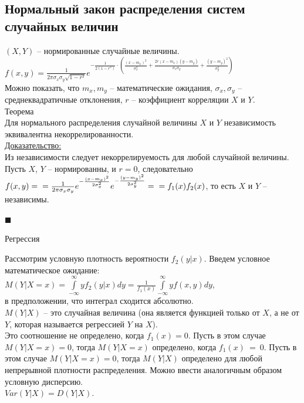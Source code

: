 \documentclass[russian, 12pt, fleqn]{article}
\begin{document}
\subsection{Нормальный закон распределения систем случайных величин}
$(X, Y)$ -- нормированные случайные величины.\\
$f(x, y) = \frac{1}{2\pi\sigma_x\sigma_y\sqrt{1-r^2}} e^{{-\frac{1}{2(1-r^2)}\cdot (\frac{(x-m_x)^2}{\sigma_x^2} + \frac{2r(x-m_x)(y-m_y)}{\sigma_x\sigma_y} + \frac{(y-m_y)^2}{\sigma_y^2})}}$\\
Можно показать, что $m_x, m_y$ -- математические ожидания, $\sigma_x ,\sigma_y$ -- среднеквадратичные  отклонения, $r$  -- коэффициент корреляции $X$ и $Y$.\\
$\textbf{Теорема}$\\
Для нормального распределения случайной величины $X$ и $Y$ независимость эквивалентна некоррелированности.\\
\underline{Доказательство:}\\
Из независимости следует некоррелируемость для любой случайной величины.\\
Пусть $X$, $Y$ -- нормированны, и $r=0$, следовательно $f(x, y) = \\=\frac{1}{2\pi\sigma_x\sigma_y}e^{-\frac{(x-m_x)^2}{2\sigma_x^2}}e^{-\frac{(y-m_y)^2}{2\sigma_y^2}}=\\=f_1(x)f_2(x)$,  то есть $X$ и $Y$ -- независимы.\\
\begin{flushright}\(\blacksquare\)\end{flushright}
\begin{center}
$\textbf{Регрессия}$
\end{center}
Рассмотрим условную плотность вероятности $f_2(y|x)$. Введем условное математическое ожидание:
$M(Y|X=x) = \displaystyle{\int \limits_{-\infty}^{\infty} y f_2(y|x) dy = \frac{1}{f_1(x)} \int \limits_{-\infty}^{\infty} y f(x,y) dy }$,\\в предположении, что интеграл сходится абсолютно.\\
$M(Y|X)$ -- это случайная величина (она является функцией только от $X$, а не от $Y$, которая называется регрессией $Y$ на $X$).\\
Это соотношение не определено, когда $f_1(x) = 0$. Пусть в этом случае \\
$M(Y|X=x) = 0$, тогда $M(Y|X=x)$ определено, когда $f_1(x)\ =\ 0$. Пусть в этом случае $M(Y|X=x) = 0$, тогда $M(Y|X)$ определено для любой непрерывной плотности распределения.  Можно ввести аналогичным образом условную дисперсию.\\$Var(Y|X) = D(Y|X)$.\\
\end{document}
